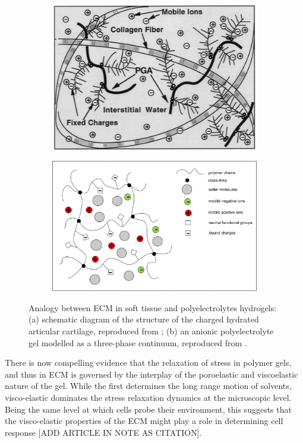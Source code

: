 \documentclass[runningheads]{llncs}
\begin{document}
\begin{figure}
	\begin{subfigure}{0.49\textwidth}
	\centering
	\includegraphics[scale=0.3]{images/ECM}
	\caption{}
	\end{subfigure}
	\begin{subfigure}{0.49\textwidth}
	\centering
	\includegraphics[scale=0.32]{images/ecmscheme.jpg}
	\caption{}
\end{subfigure}
\caption{Analogy between ECM in soft tissue and polyelectrolytes hydrogels: (a) schematic diagram of the structure of the charged hydrated articular cartilage, reproduced from \cite{pictureECM}; (b) an anionic polyelectrolyte gel modelled as a three-phase continuum, reproduced from \cite{DROZDOVph}.}
\end{figure}

There is now compelling evidence that the relaxation of stress in polymer gels, and thus in ECM is governed by the interplay of the poroelastic and viscoelastic nature of the gel. While the first determines the long range motion of solvents, visco-elastic dominates the stress relaxation dynamics at the microscopic level. Being the same level at which cells probe their environment, this suggests that the visco-elastic properties of the ECM might play a role in determining cell response [ADD ARTICLE IN NOTE AS CITATION].
\end{document}

